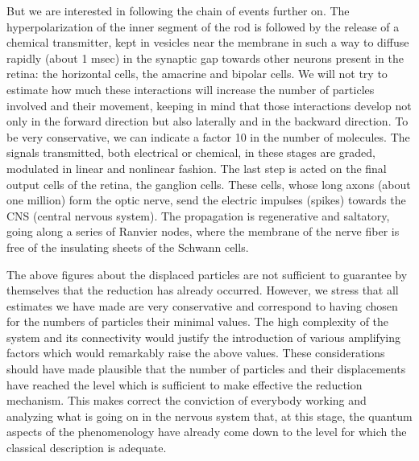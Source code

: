 \documentclass[10pt,a4paper]{article}
\begin{document}
But we are interested in following the chain of events further on.
The hyperpolarization of the inner segment of the rod is followed
by the release of a chemical transmitter, kept in vesicles near
the membrane in such a way to diffuse rapidly (about 1 msec) in
the synaptic gap towards other neurons present in the retina: the
horizontal cells, the amacrine and bipolar cells. We will not try
to estimate how much these interactions will increase the number
of particles involved and their movement, keeping in mind that
those interactions develop not only in the forward direction but
also laterally and in the backward direction. To be very
conservative, we can indicate a factor 10 in the number of
molecules. The signals transmitted, both electrical or chemical,
in these stages are graded, modulated in linear and nonlinear
fashion. The last step is acted on the final output cells of the
retina, the ganglion cells. These cells, whose long axons (about
one million) form the optic nerve, send the electric impulses
(spikes) towards the CNS (central nervous system). The propagation
is regenerative and saltatory, going along a series of Ranvier
nodes, where the membrane of the nerve fiber is free of the
insulating sheets of the Schwann cells.

The above figures about the displaced particles are not sufficient
to guarantee by themselves that the reduction has already
occurred. However, we stress that all estimates we have made are
very conservative and correspond to having chosen for the numbers
of particles their minimal values. The high complexity of the
system and its connectivity would justify the introduction of
various amplifying factors which would remarkably raise the above
values. These considerations should have made plausible that the
number of particles and their displacements have reached the level
which is sufficient to make effective the reduction mechanism.
This makes correct the conviction of everybody working and
analyzing what is going on in the nervous system that, at this
stage, the quantum aspects of the phenomenology have already come
down to the level for which the classical description is adequate.
\end{document}

